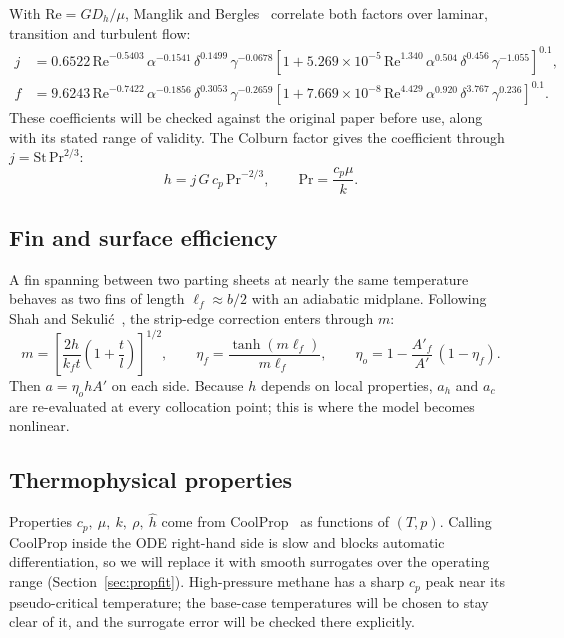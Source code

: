 \documentclass[11pt]{article}
\newcommand{\Rey}{\mathrm{Re}}
\newcommand{\Pran}{\mathrm{Pr}}
\begin{document}
With $\Rey = G D_h/\mu$, Manglik and Bergles~\cite{manglik1995} correlate both factors over laminar, transition and turbulent flow:
\begin{align}
  j &= 0.6522\,\Rey^{-0.5403}\,\alpha^{-0.1541}\,\delta^{0.1499}\,\gamma^{-0.0678}
       \left[1 + 5.269\times10^{-5}\,\Rey^{1.340}\,\alpha^{0.504}\,\delta^{0.456}\,\gamma^{-1.055}\right]^{0.1},
  \label{eq:mb_j}\\
  f &= 9.6243\,\Rey^{-0.7422}\,\alpha^{-0.1856}\,\delta^{0.3053}\,\gamma^{-0.2659}
       \left[1 + 7.669\times10^{-8}\,\Rey^{4.429}\,\alpha^{0.920}\,\delta^{3.767}\,\gamma^{0.236}\right]^{0.1}.
  \label{eq:mb_f}
\end{align}
These coefficients will be checked against the original paper before use, along with its stated range of validity. The Colburn factor gives the coefficient through $j = \mathrm{St}\,\Pran^{2/3}$:
\begin{equation}
  h = j\, G\, c_p\, \Pran^{-2/3}, \qquad \Pran = \frac{c_p \mu}{k}.
\end{equation}

\subsection{Fin and surface efficiency}

A fin spanning between two parting sheets at nearly the same temperature behaves as two fins of length $\ell_f \approx b/2$ with an adiabatic midplane. Following Shah and Sekuli\'c~\cite{shah2003}, the strip-edge correction enters through $m$:
\begin{equation}
  m = \left[\frac{2h}{k_f t}\left(1 + \frac{t}{l}\right)\right]^{1/2},
  \qquad
  \eta_f = \frac{\tanh(m \ell_f)}{m \ell_f},
  \qquad
  \eta_o = 1 - \frac{A'_f}{A'}\,(1 - \eta_f).
\end{equation}
Then $a = \eta_o h A'$ on each side. Because $h$ depends on local properties, $a_h$ and $a_c$ are re-evaluated at every collocation point; this is where the model becomes nonlinear.

\subsection{Thermophysical properties}

Properties $c_p,\ \mu,\ k,\ \rho,\ \hat h$ come from CoolProp~\cite{coolprop2014} as functions of $(T,p)$. Calling CoolProp inside the ODE right-hand side is slow and blocks automatic differentiation, so we will replace it with smooth surrogates over the operating range (Section~\ref{sec:propfit}). High-pressure methane has a sharp $c_p$ peak near its pseudo-critical temperature; the base-case temperatures will be chosen to stay clear of it, and the surrogate error will be checked there explicitly.
\end{document}
